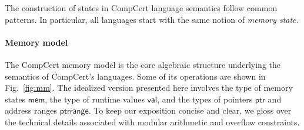 \documentclass[acmsmall,screen,review,anonymous]{acmart}
\newcommand{\kw}[1]{\ensuremath{ \mathsf{#1} }}
\begin{document}
%

The construction of states in CompCert language semantics
follow common patterns.
In particular,
all languages start with
the same notion of \emph{memory state}.


\paragraph{Memory model} \label{sec:sem:mm} %

The CompCert memory model \cite{compcertmm,compcertmmv2}
is the core algebraic structure
underlying the semantics of CompCert's languages.
Some of its operations
are shown in Fig.~\ref{fig:mm}.
The idealized version presented here
involves
the type of memory states \kw{mem},
the type of runtime values \kw{val}, and
the types of pointers \kw{ptr} and address ranges \kw{ptrrange}.
To keep our exposition concise and clear,
we gloss over the technical details
associated with modular arithmetic and overflow constraints.
\end{document}
